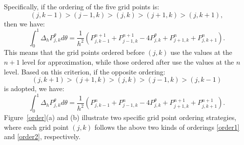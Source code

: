 \documentclass[fleqn,11pt]{elsarticle}
\numberwithin{equation}{section}
\begin{document}
Specifically, if the ordering of the five grid points is:
\begin{equation}\label{order1}
	(j, k-1) > (j-1, k) > (j, k) > (j+1, k) > (j, k+1),
\end{equation}
then we have:
\[
	\int_0^1\Delta_h P_{j,k}^\theta d\theta = \frac{1}{h^2} \left(P_{j,k-1}^{n+1} + P_{j-1, k}^{n+1} - 4 P_{j,k}^{\theta} + P_{j+1, k}^n + P_{j, k+1}^n \right).
\]
This means that the grid points ordered before $(j, k)$ use the values at the $n+1$ level for approximation, while those ordered after use the values at the $n$ level. Based on this criterion, if the opposite ordering:
\begin{equation}\label{order2}
	(j, k+1) > (j+1, k) > (j, k) > (j-1, k) > (j, k-1)
\end{equation}
is adopted, we have:
\[
	\int_0^1\Delta_h P_{j,k}^\theta d\theta = \frac{1}{h^2} \left(P_{j,k-1}^n + P_{j-1, k}^n - 4 P_{j,k}^{\theta} + P_{j+1, k}^{n+1} + P_{j, k+1}^{n+1} \right).
\]
Figure~\ref{order}(a) and (b) illustrate two specific grid point ordering strategies, where each grid point $(j,k)$ follows the above two kinds of orderings \eqref{order1} and \eqref{order2}, respectively.
\end{document}
